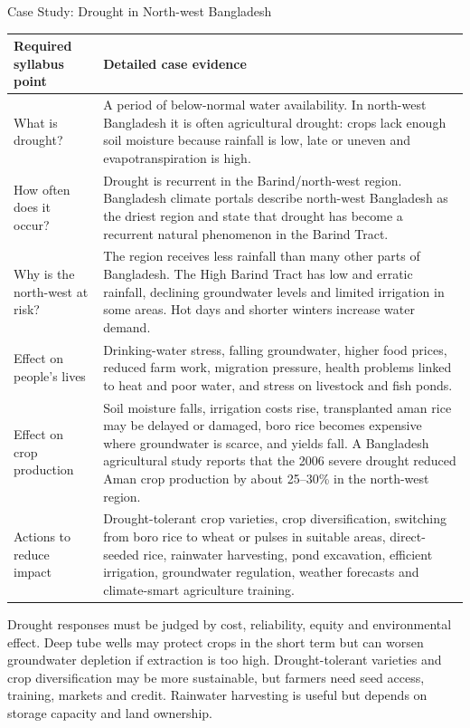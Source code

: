 \documentclass[11pt,a4paper]{article}
\begin{document}
\begin{casebox}{Case Study: Drought in North-west Bangladesh}
\begin{longtable}{p{3.35cm}p{11.2cm}}
\toprule
\textbf{Required syllabus point} & \textbf{Detailed case evidence}\\
\midrule
What is drought? & A period of below-normal water availability. In north-west Bangladesh it is often agricultural drought: crops lack enough soil moisture because rainfall is low, late or uneven and evapotranspiration is high.\\
How often does it occur? & Drought is recurrent in the Barind/north-west region. Bangladesh climate portals describe north-west Bangladesh as the driest region and state that drought has become a recurrent natural phenomenon in the Barind Tract.\\
Why is the north-west at risk? & The region receives less rainfall than many other parts of Bangladesh. The High Barind Tract has low and erratic rainfall, declining groundwater levels and limited irrigation in some areas. Hot days and shorter winters increase water demand.\\
Effect on people's lives & Drinking-water stress, falling groundwater, higher food prices, reduced farm work, migration pressure, health problems linked to heat and poor water, and stress on livestock and fish ponds.\\
Effect on crop production & Soil moisture falls, irrigation costs rise, transplanted aman rice may be delayed or damaged, boro rice becomes expensive where groundwater is scarce, and yields fall. A Bangladesh agricultural study reports that the 2006 severe drought reduced Aman crop production by about 25--30\% in the north-west region.\\
Actions to reduce impact & Drought-tolerant crop varieties, crop diversification, switching from boro rice to wheat or pulses in suitable areas, direct-seeded rice, rainwater harvesting, pond excavation, efficient irrigation, groundwater regulation, weather forecasts and climate-smart agriculture training.\\
\bottomrule
\end{longtable}
\end{casebox}

Drought responses must be judged by cost, reliability, equity and environmental effect. Deep tube wells may protect crops in the short term but can worsen groundwater depletion if extraction is too high. Drought-tolerant varieties and crop diversification may be more sustainable, but farmers need seed access, training, markets and credit. Rainwater harvesting is useful but depends on storage capacity and land ownership.
\end{document}
